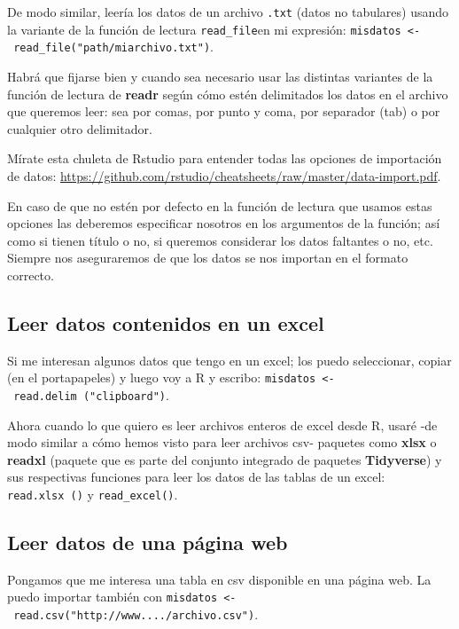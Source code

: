 \documentclass[]{book}
\theoremstyle{definition}
\theoremstyle{definition}
\theoremstyle{definition}
\theoremstyle{remark}
\begin{document}
De modo similar, leería los datos de un archivo \texttt{.txt} (datos no
tabulares) usando la variante de la función de lectura
\texttt{read\_file}en mi expresión:
\texttt{misdatos\ \textless{}-\ read\_file("path/miarchivo.txt")}.

Habrá que fijarse bien y cuando sea necesario usar las distintas
variantes de la función de lectura de \textbf{readr} según cómo estén
delimitados los datos en el archivo que queremos leer: sea por comas,
por punto y coma, por separador (tab) o por cualquier otro delimitador.

Mírate esta chuleta de Rstudio para entender todas las opciones de
importación de datos:
\url{https://github.com/rstudio/cheatsheets/raw/master/data-import.pdf}.

En caso de que no estén por defecto en la función de lectura que usamos
estas opciones las deberemos especificar nosotros en los argumentos de
la función; así como si tienen título o no, si queremos considerar los
datos faltantes o no, etc. Siempre nos aseguraremos de que los datos se
nos importan en el formato correcto.

\hypertarget{leer-datos-contenidos-en-un-excel}{%
\subsection{Leer datos contenidos en un
excel}\label{leer-datos-contenidos-en-un-excel}}

Si me interesan algunos datos que tengo en un excel; los puedo
seleccionar, copiar (en el portapapeles) y luego voy a R y escribo:
\texttt{misdatos\ \textless{}-\ read.delim\ ("clipboard")}.

Ahora cuando lo que quiero es leer archivos enteros de excel desde R,
usaré -de modo similar a cómo hemos visto para leer archivos csv-
paquetes como \textbf{xlsx} \citep{R-xlsx} o \textbf{readxl}
\citep{R-readxl} (paquete que es parte del conjunto integrado de
paquetes \textbf{Tidyverse}) y sus respectivas funciones para leer los
datos de las tablas de un excel: \texttt{read.xlsx\ ()} y
\texttt{read\_excel()}.

\hypertarget{leer-datos-de-una-pagina-web}{%
\subsection{Leer datos de una página
web}\label{leer-datos-de-una-pagina-web}}

Pongamos que me interesa una tabla en csv disponible en una página web.
La puedo importar también con
\texttt{misdatos\ \textless{}-\ read.csv("http://www..../archivo.csv")}.
\end{document}
